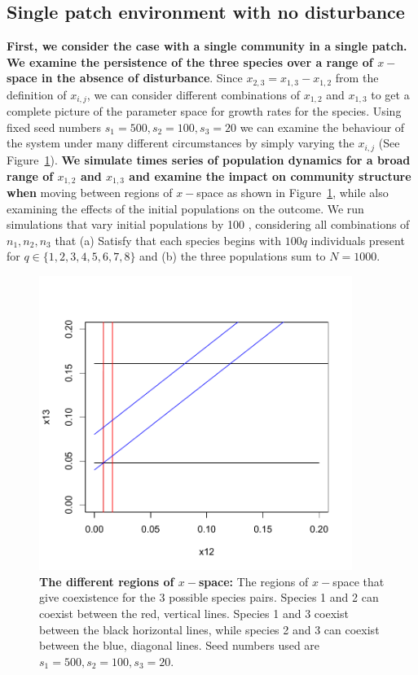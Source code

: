 \subsection{Single patch environment with no disturbance}
\textbf{First, we consider the case with a single community in a single patch. We examine the persistence of the three species over a range of $x-$space in the absence of disturbance}. Since $x_{2,3}=x_{1,3}-x_{1,2}$ from the definition of $x_{i,j}$, we can consider different combinations of 
$x_{1,2}$ and $x_{1,3}$ to get a complete picture of the parameter space for growth rates for the species. Using fixed seed numbers $s_1=500,s_2=100,s_3=20$ we can examine the behaviour of the system under many different circumstances by simply varying the $x_{i,j}$ (See Figure~\ref{xregions}). \textbf{We simulate times series of population dynamics for a broad range of $x_{1,2}$ and $x_{1,3}$ and examine the impact on community structure when} moving between regions of $x-$space as shown in Figure~\ref{xregions}, while also examining the effects of the initial populations on the outcome. We run simulations that vary initial populations by 100 , considering all combinations of $n_1,n_2,n_3$ that (a) Satisfy that each species begins with $100q$ individuals present for $q \in \{1,2,3,4,5,6,7,8\}$ and (b) the three populations sum to $N=1000$. 
\begin{figure}[htbp]
\begin{center}
\includegraphics[width=4in]{3dxchoices.pdf}
\caption[The different regions of $x-$space]{\textbf{The different regions of $x-$space:} The regions of $x-$space that give coexistence for the 3 possible species pairs. Species 1 and 2 can coexist between the red, vertical lines. Species 1 and 3 coexist between the black horizontal lines, while species 2 and 3 can coexist between the blue, diagonal lines. Seed numbers used are $s_1=500,s_2=100,s_3=20$.}
\label{xregions}
\end{center}
\end{figure}
